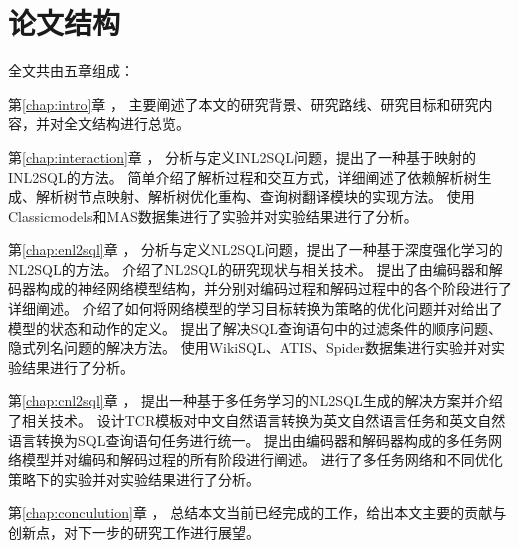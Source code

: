 \section{论文结构}
\label{intro:structure}
全文共由五章组成：

第\ref{chap:intro}章  ， 
主要阐述了本文的研究背景、研究路线、研究目标和研究内容，并对全文结构进行总览。

第\ref{chap:interaction}章  ，
分析与定义INL2SQL问题，提出了一种基于映射的INL2SQL的方法。
简单介绍了解析过程和交互方式，详细阐述了依赖解析树生成、解析树节点映射、解析树优化重构、查询树翻译模块的实现方法。
使用Classicmodels和MAS数据集进行了实验并对实验结果进行了分析。

第\ref{chap:enl2sql}章  ，
分析与定义NL2SQL问题，提出了一种基于深度强化学习的NL2SQL的方法。
介绍了NL2SQL的研究现状与相关技术。
提出了由编码器和解码器构成的神经网络模型结构，并分别对编码过程和解码过程中的各个阶段进行了详细阐述。
介绍了如何将网络模型的学习目标转换为策略的优化问题并对给出了模型的状态和动作的定义。
提出了解决SQL查询语句中的过滤条件的顺序问题、隐式列名问题的解决方法。
使用WikiSQL、ATIS、Spider数据集进行实验并对实验结果进行了分析。

第\ref{chap:cnl2sql}章  ，
提出一种基于多任务学习的NL2SQL生成的解决方案并介绍了相关技术。
设计TCR模板对中文自然语言转换为英文自然语言任务和英文自然语言转换为SQL查询语句任务进行统一。
提出由编码器和解码器构成的多任务网络模型并对编码和解码过程的所有阶段进行阐述。
进行了多任务网络和不同优化策略下的实验并对实验结果进行了分析。

第\ref{chap:conculution}章  ，
总结本文当前已经完成的工作，给出本文主要的贡献与创新点，对下一步的研究工作进行展望。